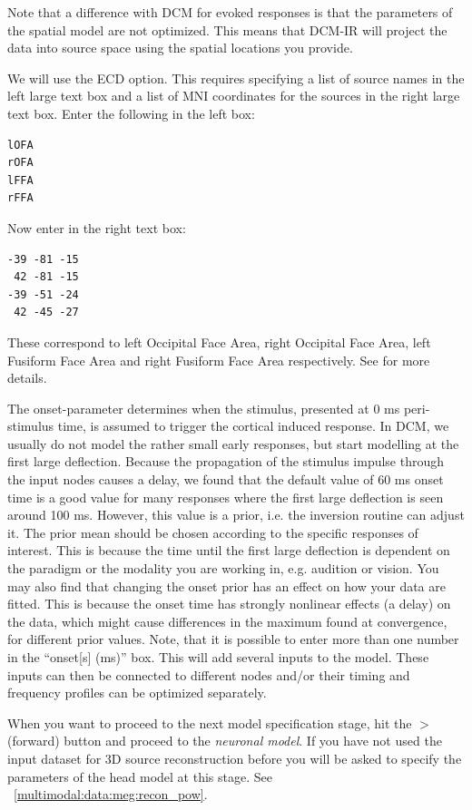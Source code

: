 Note that a difference with DCM for evoked responses is that the parameters of the spatial model are not optimized. This means that DCM-IR will project the data into source space using the spatial locations you provide.

We will use the ECD option. This requires specifying a list of source names in the left large text box and a list of MNI coordinates for the sources in the right large text box. Enter the following in the left box:

\begin{verbatim}
lOFA
rOFA
lFFA
rFFA
\end{verbatim}

Now enter in the right text box:

\begin{verbatim}
-39 -81 -15
 42 -81 -15
-39 -51 -24
 42 -45 -27
\end{verbatim}

These correspond to left Occipital Face Area, right Occipital Face Area, left Fusiform Face Area and right Fusiform Face Area respectively. See \cite{cc_induced} for more details.

The onset-parameter determines when the stimulus, presented at 0 ms peri-stimulus time, is assumed to trigger the cortical induced response. In DCM, we usually do not model the rather small early responses, but start modelling at the first large deflection. Because the propagation of the stimulus impulse through the input nodes causes a delay, we found that the default value of 60
ms onset time is a good value for many responses where the first large deflection is seen around 100 ms. However, this value is a
prior, i.e. the inversion routine can adjust it. The prior mean should be chosen according to the specific responses of interest. This is because the time until the first large deflection is dependent on the paradigm or the modality you are working in, e.g. audition or vision. You may also find that changing the onset prior has an effect on how your data are
fitted. This is because the onset time has strongly nonlinear effects (a delay) on the data, which might cause differences in the maximum found at convergence, for different prior values. Note, that it is possible to enter more than one number in the ``onset[s] (ms)'' box. This will add several inputs to the model. These inputs can then be connected to different nodes and/or their timing and frequency profiles can be optimized separately.

When you want to proceed to the next model specification stage, hit the $>$ (forward) button and proceed to the \textit{neuronal model}. If you have not used the input dataset for 3D source reconstruction before you will be asked to specify the parameters of the head model at this stage. See ~\ref{multimodal:data:meg:recon_pow}.

